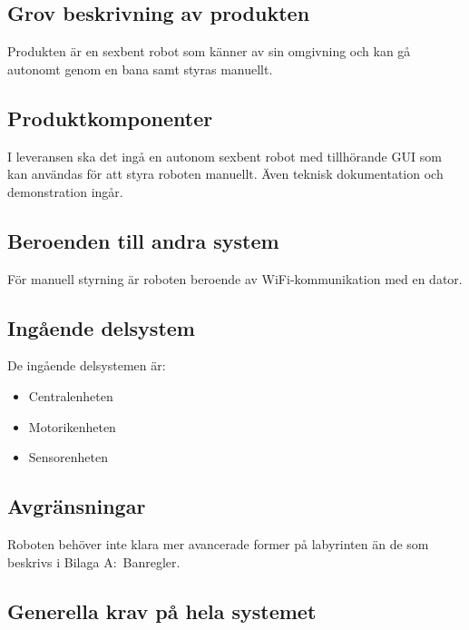 \documentclass[a4paper,titlepage,12pt]{article}
\begin{document}
	\subsection{Grov beskrivning av produkten}
	Produkten är en sexbent robot som känner av sin omgivning och kan gå autonomt
	genom en bana samt styras manuellt.
	\subsection{Produktkomponenter}
	I leveransen ska det ingå en autonom sexbent robot med tillhörande GUI som kan användas för att 
	styra roboten manuellt. Även teknisk dokumentation och demonstration ingår. 
	\subsection{Beroenden  till andra system}
    För manuell styrning är roboten beroende av WiFi-kommunikation med en dator.
	\subsection{Ingående delsystem}
    De ingående delsystemen är:
    
    \begin{itemize}
        \item Centralenheten
        \item Motorikenheten
        \item Sensorenheten
    \end{itemize}
	\subsection{Avgränsningar}
	Roboten behöver inte klara mer avancerade former på labyrinten än de som beskrivs i Bilaga A:\ Banregler.
	\subsection{Generella krav på hela systemet}
\end{document}
